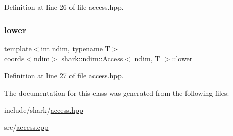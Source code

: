 Definition at line 26 of file access.\+hpp.

\hypertarget{classshark_1_1ndim_1_1_access_ac1e92dba307ff877963c94bd42fcbafb}{}\label{classshark_1_1ndim_1_1_access_ac1e92dba307ff877963c94bd42fcbafb} 
\subsubsection{\texorpdfstring{lower}{lower}}
{\footnotesize\ttfamily template$<$int ndim, typename T$>$ \\
\hyperlink{structshark_1_1ndim_1_1coords}{coords}$<$ndim$>$ \hyperlink{classshark_1_1ndim_1_1_access}{shark\+::ndim\+::\+Access}$<$ ndim, T $>$\+::lower\hspace{0.3cm}{\ttfamily [private]}}



Definition at line 27 of file access.\+hpp.



The documentation for this class was generated from the following files\+:\begin{DoxyCompactItemize}
\item 
include/shark/\hyperlink{access_8hpp}{access.\+hpp}\item 
src/\hyperlink{access_8cpp}{access.\+cpp}\end{DoxyCompactItemize}
